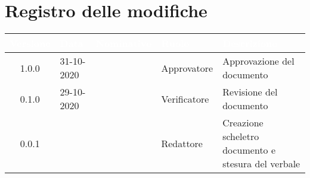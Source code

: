\section*{Registro delle modifiche}
{
\renewcommand{\arraystretch}{1.5}
\centering
\begin{longtable}{c C{2.6cm}  C{2.6cm} C{2.6cm} C{3.5cm}}
\textcolor{white}{\textbf{Versione}}&
\textcolor{white}{\textbf{Data}}&
\textcolor{white}{\textbf{Nominativo}}&
\textcolor{white}{\textbf{Ruolo}}&
\textcolor{white}{\textbf{Descrizione}}\\	
\endhead
		
1.0.0 & 31-10-2020 & \Approvatore{} & Approvatore & Approvazione del documento\\

0.1.0 & 29-10-2020 & \Verificatori{} & Verificatore & Revisione del documento\\

0.0.1 & \Data{} & \Redattori{} & Redattore & Creazione scheletro documento e stesura del verbale\\
		
\end{longtable}
}
